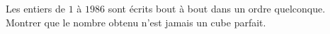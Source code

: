 Les entiers de $1$ à $1986$ sont écrits bout à bout dans un ordre quelconque. Montrer que le nombre obtenu n'est jamais un cube parfait.
